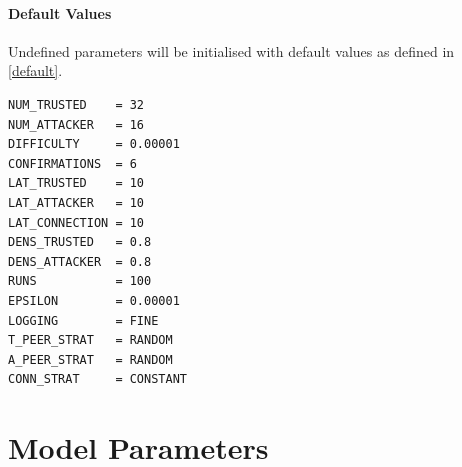 \documentclass[a4paper,12pt,twoside]{report}
\begin{document}
\subsubsection{Default Values}\label{defaultval}
Undefined parameters will be initialised with default values as defined in \autoref{default}. 
\begin{lstlisting}[caption=Default parameter values,label=default]
NUM_TRUSTED    = 32
NUM_ATTACKER   = 16
DIFFICULTY     = 0.00001
CONFIRMATIONS  = 6
LAT_TRUSTED    = 10
LAT_ATTACKER   = 10
LAT_CONNECTION = 10
DENS_TRUSTED   = 0.8
DENS_ATTACKER  = 0.8
RUNS           = 100
EPSILON        = 0.00001
LOGGING        = FINE
T_PEER_STRAT   = RANDOM
A_PEER_STRAT   = RANDOM
CONN_STRAT     = CONSTANT
\end{lstlisting}

\chapter{Model Parameters} \label{modelparams}
\end{document}
